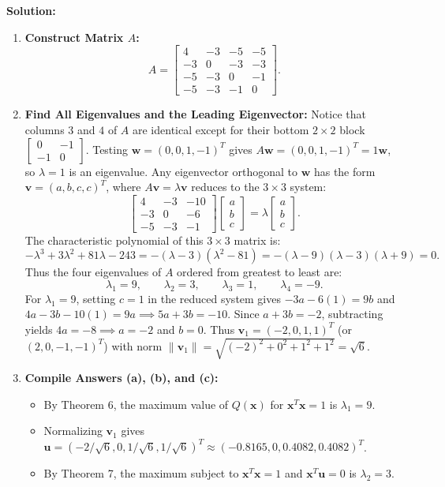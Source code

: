\documentclass[11pt, letterpaper]{article}
\theoremstyle{definition}
\theoremstyle{remark}
\begin{document}
\textbf{Solution:}
\begin{enumerate}[label=\textbf{Step \arabic*:}]
    \item \textbf{Construct Matrix $A$:}
    \[
    A = \begin{bmatrix} 4 & -3 & -5 & -5 \\ -3 & 0 & -3 & -3 \\ -5 & -3 & 0 & -1 \\ -5 & -3 & -1 & 0 \end{bmatrix}.
    \]
    \item \textbf{Find All Eigenvalues and the Leading Eigenvector:}
    Notice that columns $3$ and $4$ of $A$ are identical except for their bottom $2 \times 2$ block $\begin{bmatrix} 0 & -1 \\ -1 & 0 \end{bmatrix}$. Testing $\mathbf{w} = (0, 0, 1, -1)^T$ gives $A\mathbf{w} = (0, 0, 1, -1)^T = 1\mathbf{w}$, so $\lambda = 1$ is an eigenvalue.
    Any eigenvector orthogonal to $\mathbf{w}$ has the form $\mathbf{v} = (a, b, c, c)^T$, where $A\mathbf{v} = \lambda \mathbf{v}$ reduces to the $3 \times 3$ system:
    \[
    \begin{bmatrix} 4 & -3 & -10 \\ -3 & 0 & -6 \\ -5 & -3 & -1 \end{bmatrix} \begin{bmatrix} a \\ b \\ c \end{bmatrix} = \lambda \begin{bmatrix} a \\ b \\ c \end{bmatrix}.
    \]
    The characteristic polynomial of this $3 \times 3$ matrix is:
    \[
    -\lambda^3 + 3\lambda^2 + 81\lambda - 243 = -(\lambda - 3)(\lambda^2 - 81) = -(\lambda - 9)(\lambda - 3)(\lambda + 9) = 0.
    \]
    Thus the four eigenvalues of $A$ ordered from greatest to least are:
    \[
    \lambda_1 = 9, \qquad \lambda_2 = 3, \qquad \lambda_3 = 1, \qquad \lambda_4 = -9.
    \]
    For $\lambda_1 = 9$, setting $c = 1$ in the reduced system gives $-3a - 6(1) = 9b$ and $4a - 3b - 10(1) = 9a \implies 5a + 3b = -10$. Since $a + 3b = -2$, subtracting yields $4a = -8 \implies a = -2$ and $b = 0$.
    Thus $\mathbf{v}_1 = (-2, 0, 1, 1)^T$ (or $(2, 0, -1, -1)^T$) with norm $\|\mathbf{v}_1\| = \sqrt{(-2)^2 + 0^2 + 1^2 + 1^2} = \sqrt{6}$.
    \item \textbf{Compile Answers (a), (b), and (c):}
    \begin{itemize}
        \item[(a)] By Theorem 6, the maximum value of $Q(\mathbf{x})$ for $\mathbf{x}^T\mathbf{x} = 1$ is $\lambda_1 = 9$.
        \item[(b)] Normalizing $\mathbf{v}_1$ gives $\mathbf{u} = (-2/\sqrt{6}, 0, 1/\sqrt{6}, 1/\sqrt{6})^T \approx (-0.8165, 0, 0.4082, 0.4082)^T$.
        \item[(c)] By Theorem 7, the maximum subject to $\mathbf{x}^T\mathbf{x} = 1$ and $\mathbf{x}^T\mathbf{u} = 0$ is $\lambda_2 = 3$.
    \end{itemize}
\end{enumerate}
\end{document}
